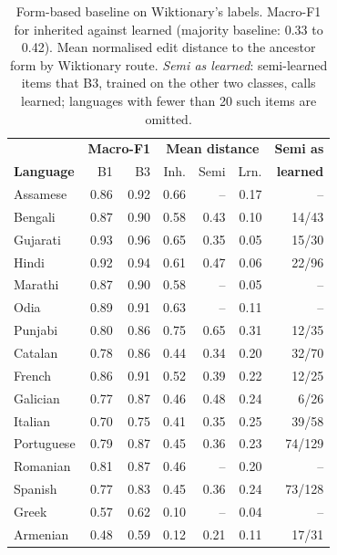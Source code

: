 \documentclass[11pt]{article}
\begin{document}
\begin{table}[t]
\centering\small
\setlength{\tabcolsep}{3.5pt}
\begin{tabular}{lrrrrrr}
\toprule
& \multicolumn{2}{c}{\textbf{Macro-F1}} & \multicolumn{3}{c}{\textbf{Mean distance}} & \textbf{Semi as} \\
\textbf{Language} & B1 & B3 & Inh. & Semi & Lrn. & \textbf{learned} \\
\midrule
Assamese & 0.86 & 0.92 & 0.66 & -- & 0.17 & -- \\
Bengali & 0.87 & 0.90 & 0.58 & 0.43 & 0.10 & 14/43 \\
Gujarati & 0.93 & 0.96 & 0.65 & 0.35 & 0.05 & 15/30 \\
Hindi & 0.92 & 0.94 & 0.61 & 0.47 & 0.06 & 22/96 \\
Marathi & 0.87 & 0.90 & 0.58 & -- & 0.05 & -- \\
Odia & 0.89 & 0.91 & 0.63 & -- & 0.11 & -- \\
Punjabi & 0.80 & 0.86 & 0.75 & 0.65 & 0.31 & 12/35 \\
\midrule
Catalan & 0.78 & 0.86 & 0.44 & 0.34 & 0.20 & 32/70 \\
French & 0.86 & 0.91 & 0.52 & 0.39 & 0.22 & 12/25 \\
Galician & 0.77 & 0.87 & 0.46 & 0.48 & 0.24 & 6/26 \\
Italian & 0.70 & 0.75 & 0.41 & 0.35 & 0.25 & 39/58 \\
Portuguese & 0.79 & 0.87 & 0.45 & 0.36 & 0.23 & 74/129 \\
Romanian & 0.81 & 0.87 & 0.46 & -- & 0.20 & -- \\
Spanish & 0.77 & 0.83 & 0.45 & 0.36 & 0.24 & 73/128 \\
\midrule
Greek & 0.57 & 0.62 & 0.10 & -- & 0.04 & -- \\
\midrule
Armenian & 0.48 & 0.59 & 0.12 & 0.21 & 0.11 & 17/31 \\
\bottomrule
\end{tabular}
\caption{Form-based baseline on Wiktionary's labels. Macro-F1 for inherited against learned (majority baseline: 0.33 to 0.42). Mean normalised edit distance to the ancestor form by Wiktionary route. \textit{Semi as learned}: semi-learned items that B3, trained on the other two classes, calls learned; languages with fewer than 20 such items are omitted.}
\label{tab:baseline}
\end{table}
\end{document}
